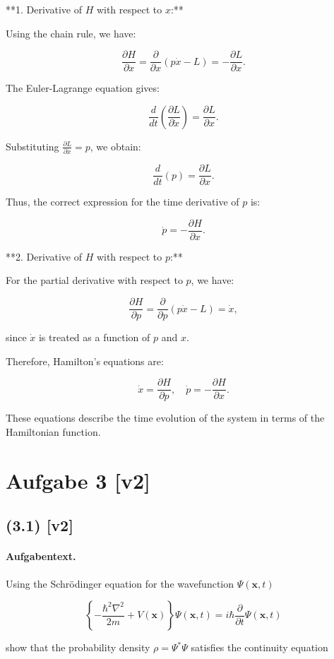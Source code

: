 \documentclass[11pt,a4paper]{article}
\begin{document}
**1. Derivative of \( H \) with respect to \( x \):**

Using the chain rule, we have:

$$
\frac{\partial H}{\partial x} = \frac{\partial}{\partial x} (p \dot{x} - L) = -\frac{\partial L}{\partial x}.
$$

The Euler-Lagrange equation gives:

$$
\frac{d}{dt} \left( \frac{\partial L}{\partial \dot{x}} \right) = \frac{\partial L}{\partial x}.
$$

Substituting \( \frac{\partial L}{\partial \dot{x}} = p \), we obtain:

$$
\frac{d}{dt}(p) = \frac{\partial L}{\partial x}.
$$

Thus, the correct expression for the time derivative of \( p \) is:

$$
\dot{p} = -\frac{\partial H}{\partial x}.
$$

**2. Derivative of \( H \) with respect to \( p \):**

For the partial derivative with respect to \( p \), we have:

$$
\frac{\partial H}{\partial p} = \frac{\partial}{\partial p} (p \dot{x} - L) = \dot{x},
$$

since \( \dot{x} \) is treated as a function of \( p \) and \( x \).

Therefore, Hamilton's equations are:

$$
\dot{x} = \frac{\partial H}{\partial p}, \quad \dot{p} = -\frac{\partial H}{\partial x}.
$$

These equations describe the time evolution of the system in terms of the Hamiltonian function.

\section*{Aufgabe 3 [v2]}
\subsection*{(3.1) [v2]}
\paragraph{Aufgabentext.}
Using the Schrödinger equation for the wavefunction $\Psi(\mathbf{x}, t)$

$$
\left\{-\frac{\hbar^2 \nabla^2}{2 m}+V(\mathbf{x})\right\} \Psi(\mathbf{x}, t)=i \hbar \frac{\partial}{\partial t} \Psi(\mathbf{x}, t)
$$

show that the probability density $\rho=\Psi^* \Psi$ satisfies the continuity equation
\end{document}
